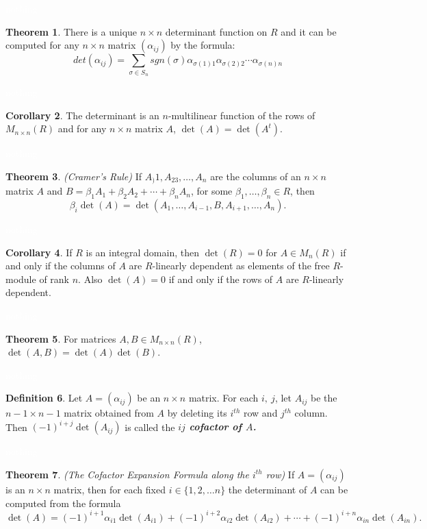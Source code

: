 \documentclass{article}
\theoremstyle{definition}
\newtheorem{thm}{Theorem}[section]
\newtheorem{cor}[thm]{Corollary}
\newtheorem{defn}[thm]{Definition}
\newcommand{\nl}{\textcolor{white}{nothing}}
\newcommand{\al}{\alpha}
\newcommand{\be}{\beta}
\begin{document}
\nl

\begin{thm}
There is a unique $n\times n$ determinant function on $R$ and it can be computed for any $n\times n$ matrix $(\al_{ij})$ by the formula:
\[det(\al_{ij}) = \sum_{\sigma\in S_n} sgn(\sigma) \al_{\sigma(1)1} \al_{\sigma(2)2} \cdots \al_{\sigma(n)n}\]
\end{thm}

\nl

\begin{cor}
The determinant is an $n$-multilinear function of the rows of $M_{n\times n}(R)$ and for any $n\times n $ matrix $A$, $\det(A) = \det(A^t)$.
\end{cor}

\nl

\begin{thm}\textit{(Cramer's Rule)}
If $A_)1,A_23,\ldots, A_n$ are the columns of an $n\times n$ matrix $A$ and $B = \be_1A_1 + \be_2A_2 + \cdots + \be_nA_n$, for some $\be_1,\ldots, \be_n\in R$, then
\[\be_i\det(A) = \det(A_1,\ldots,A_{i-1}, B, A_{i+1},\ldots, A_n).\]
\end{thm}

\nl

\begin{cor}
If $R$ is an integral domain, then $\det(R) = 0$ for $A\in M_n(R)$ if and only if the columns of $A$ are $R$-linearly dependent as elements of the free $R$-module of rank $n$. Also $\det(A) = 0$ if and only if the rows of $A$ are $R$-linearly dependent.
\end{cor}

\nl

\begin{thm}
For matrices $A, B\in M_{n\times n}(R)$, $\det(A,B) = \det(A)\det(B)$.
\end{thm}

\nl

\begin{defn}
Let $A = (\al_{ij})$ be an $n\times n$ matrix. For each $i,\ j$, let $A_{ij}$ be the $n-1\times n-1$ matrix obtained from $A$ by deleting its $i^{th}$ row and $j^{th}$ column. Then $(-1)^{i + j}\det(A_{ij})$ is called the \textit{\textbf{$ij$ cofactor of $A$.}}
\end{defn}

\nl

\begin{thm}\textit{(The Cofactor Expansion Formula along the $i^{th}$ row)}
If $A = (\al_{ij})$ is an $n\times n$ matrix, then for each fixed $i\in \{1,2,\ldots n\}$ the determinant of $A$ can be computed from the formula
\[\det(A) = (-1)^{i+1}\al_{i1}\det(A_{i1}) + (-1)^{i+2}\al_{i2}\det(A_{i2}) + \cdots + (-1)^{i+n}\al_{in}\det(A_{in}).\]
\end{thm}
\end{document}
